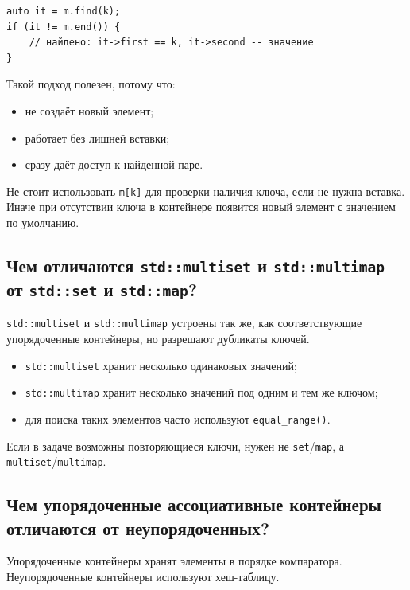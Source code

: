 \begin{verbatim}
auto it = m.find(k);
if (it != m.end()) {
    // найдено: it->first == k, it->second -- значение
}
\end{verbatim}

Такой подход полезен, потому что:
\begin{itemize}
    \item не создаёт новый элемент;
    \item работает без лишней вставки;
    \item сразу даёт доступ к найденной паре.
\end{itemize}

\begin{remark}
Не стоит использовать \texttt{m[k]} для проверки наличия ключа, если не нужна вставка. Иначе при отсутствии ключа в контейнере появится новый элемент с значением по умолчанию.
\end{remark}

\subsection{Чем отличаются \texttt{std::multiset} и \texttt{std::multimap} от \texttt{std::set} и \texttt{std::map}?}
\texttt{std::multiset} и \texttt{std::multimap} устроены так же, как соответствующие упорядоченные контейнеры, но разрешают дубликаты ключей.

\begin{itemize}
    \item \texttt{std::multiset} хранит несколько одинаковых значений;
    \item \texttt{std::multimap} хранит несколько значений под одним и тем же ключом;
    \item для поиска таких элементов часто используют \texttt{equal\_range()}.
\end{itemize}

\begin{remark}
Если в задаче возможны повторяющиеся ключи, нужен не \texttt{set}/\texttt{map}, а \texttt{multiset}/\texttt{multimap}.
\end{remark}

\subsection{Чем упорядоченные ассоциативные контейнеры отличаются от неупорядоченных?}
Упорядоченные контейнеры хранят элементы в порядке компаратора. Неупорядоченные контейнеры используют хеш-таблицу.

